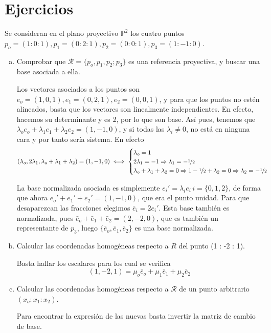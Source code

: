 \section{Ejercicios}
\begin{ejer}
    [9] Se consideran en el plano proyectivo $\mathbb P^2$ los cuatro puntos $p_o = (1 : 0 : 1), p_1 = (0 : 2 : 1), p_2 = (0 : 0 : 1), p_3 = (1 : -1 : 0)$. 
    \begin{enumerate}[a)]
        \item Comprobar que $\mathcal R = \{p_o, p_1, p_2; p_3\}$ es una referencia proyectiva, y buscar una base asociada a ella. 
        \begin{sol}
            Los vectores asociados a los puntos son $e_o=(1,0,1), e_1=(0,2,1), e_2=(0,0,1)$, y para que los puntos no est\'en alineados, basta que los vectores son linealmente independientes. En efecto, hacemos su determinante y es 2, por lo que son base. As\'i pues, tenemos que $\lambda_o e_o + \lambda_1 e_1 + \lambda_2 e_2 = (1,-1,0)$, y si todas las $\lambda_i \neq 0$, no est\'a en ninguna cara y por tanto ser\'ia sistema. En efecto
            $$(\lambda_o, 2\lambda_1, \lambda_o+\lambda_1+\lambda_2) = (1,-1,0) \iff \begin{cases}
                \lambda_o = 1 \\ 2\lambda_1=-1 \Rightarrow \lambda_1= -\nicefrac{1}{2} \\ \lambda_o+\lambda_1+\lambda_2 = 0 \Rightarrow 1- \nicefrac{1}{2} + \lambda_2=0 \Rightarrow \lambda_2=-\nicefrac{1}{2}
            \end{cases}$$

            La base normalizada asociada es simplemente $e_i'=\lambda_i e_i \, i =\{0,1,2\}$, de forma que ahora $e_o'+e_1'+e_2'=(1,-1,0)$, que era el punto unidad. Para que desaparezcan las fracciones elegimos $\bar{e}_i=2 e_i'$. Esta base tambi\'en es normalizada, pues $\bar{e}_o+\bar{e}_1+\bar{e}_2=(2,-2,0)$, que es tambi\'en un representante de $p_3$, luego $\{\bar{e}_o,\bar{e}_1,\bar{e}_2\}$ es una base normalizada.
        \end{sol}
        \item Calcular las coordenadas homog\'eneas respecto a $R$ del punto (1 : -2 : 1).
        \begin{sol}
        Basta hallar los escalares para los cual se verifica
            $$(1,-2,1) = \mu_o \bar{e}_o+\mu_1\bar{e}_1+\mu_2\bar{e}_2$$
        \end{sol}
        \item  Calcular las coordenadas homog\'eneas respecto a $\mathcal R$ de un punto arbitrario $(x_o : x_1 : x_2)$.
        \begin{sol}
            Para encontrar la expresi\'on de las nuevas basta invertir la matriz de cambio de base.
        \end{sol}
    \end{enumerate}
\end{ejer}
